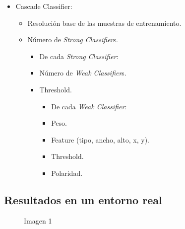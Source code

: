 \documentclass[11pt,spanish,a4paper]{article} %
\begin{document}
\begin{itemize}
\item Cascade Classifier:
  \begin{itemize}
  \item Resolución base de las muestras de entrenamiento.
  \item Número de \textit{Strong Classifier}s.
  \begin{itemize}
  \item De cada \textit{Strong Classifier}:
  \item Número de \textit{Weak Classifier}s.
  \item Threshold.
  \begin{itemize}
  \item De cada \textit{Weak Classifier}:
  \item Peso.
  \item Feature (tipo, ancho, alto, x, y).
  \item Threshold.
  \item Polaridad.
  \end{itemize}
  \end{itemize}
  \end{itemize}
\end{itemize}

\subsection{Resultados en un entorno real}

\begin{figure}[H]
\caption{Imagen 1}
\label{fig:det1}
\end{figure}
\end{document}
